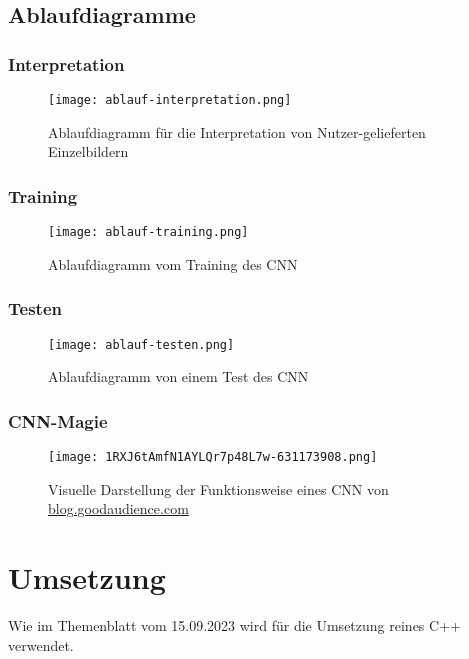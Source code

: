 \subsection{Ablaufdiagramme}
\label{sec:AnalyseAblaufdiagramme}

\subsubsection{Interpretation}
\label{sec:AnalyseInterpretation}
\begin{figure}[H]
	\centering
	\texttt{[image: ablauf-interpretation.png]}
	\caption{Ablaufdiagramm für die Interpretation von Nutzer-gelieferten Einzelbildern}
	\label{fig:analyseablauf-interpretation}
\end{figure}


\subsubsection{Training}
\label{sec:AnalyseTraining}
\begin{figure}[H]
	\centering
	\texttt{[image: ablauf-training.png]}
	\caption{Ablaufdiagramm vom Training des CNN}
	\label{fig:analyseablauf-training}
\end{figure}


\subsubsection{Testen}
\label{sec:AnalyseTesten}
\begin{figure}[H]
	\centering
	\texttt{[image: ablauf-testen.png]}
	\caption{Ablaufdiagramm von einem Test des CNN}
	\label{fig:analyseablauf-testen}
\end{figure}


\subsubsection{CNN-Magie}
\label{sec:AnalyseCNN-Magic}
\begin{figure}[H]
	\centering
	\texttt{[image: 1RXJ6tAmfN1AYLQr7p48L7w-631173908.png]}
	\caption{Visuelle Darstellung der Funktionsweise eines CNN von \href{https://blog.goodaudience.com/cnn-for-rnns-a-gentle-approach-to-use-cnns-for-nlp-53ab80768d43}{blog.goodaudience.com}}
	\label{fig:analyse1RXJ6tAmfN1AYLQr7p48L7w-631173908}
\end{figure}

\section{Umsetzung}
\label{sec:AnalyseUmsetzung}
Wie im Themenblatt vom 15.09.2023 wird für die Umsetzung reines C++ verwendet.

